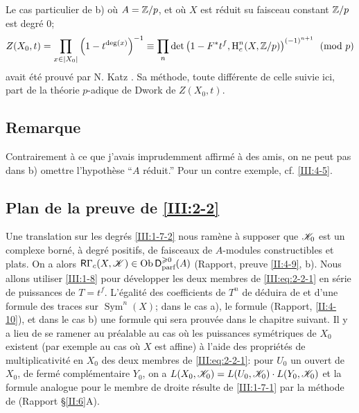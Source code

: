 Le cas particulier de b) où $A=\mathbb{Z}/p$, et où $X$ est réduit su faisceau 
constant $\mathbb{Z}/p$ est degré $0$;
\[
  Z(X_0,t) = \prod_{x\in |X_0|} \left(1-t^{\deg(x)}\right)^{-1}
      \equiv \prod_n \det\left(1-F^* t^f,\operatorname{H}_c^n(X,\mathbb{Z}/p)\right)^{(-1)^{n+1}} \pmod p
\]
avait été prouvé par N. Katz \cite[XXII 3.1]{sga7}. Sa méthode, toute 
différente de celle suivie ici, part de la théorie $p$-adique de Dwork de 
$Z(X_0,t)$. 





\subsection{Remarque}\label{III:2-7}


Contrairement à ce que j'avais imprudemment affirmé à des amis, on ne 
peut pas dans b) omettre l'hypothèse ``$A$ réduit.'' Pour un contre 
exemple, cf. \ref{III:4-5}. 





\subsection{Plan de la preuve de \ref{III:2-2}}\label{III:2-8}

Une translation sur les degrés \ref{III:1-7-2} nous ramène à supposer 
que $\mathscr{K}_0$ est un complexe borné, à degré positifs, de faisceaux de 
$A$-modules constructibles et plats. On a alors 
$\mathsf{R}\Gamma_c(X,\mathscr{K})\in \operatorname{Ob}\mathsf{D}_\text{parf}^{\geqslant 0}(A)$ (Rapport, 
preuve \ref{II:4-9}, b). Nous allons utiliser \ref{III:1-8} pour développer 
les deux membres de \eqref{III:eq:2-2-1} en série de puissances de $T=t^f$. 
L'égalité des coefficients de $T^n$ de déduira de 
\cite[XVII 5.5.21]{sga4} et d'une formule des traces sur 
$\operatorname{Sym}^n(X)$; dans le cas a), le formule (Rapport, 
\ref{II:4-10}), et dans le cas b) une formule qui sera prouvée dans le 
chapitre suivant. Il y a lieu de se ramener au préalable au cas où les 
puissances symétriques de $X_0$ existent (par exemple au cas où $X$ est 
affine) à l'aide des propriétés de multiplicativité en $X_0$ des deux 
membres de \eqref{III:eq:2-2-1}: pour $U_0$ un ouvert de $X_0$, de fermé 
complémentaire $Y_0$, on a $L(X_0,\mathscr{K}_0)=L(U_0,\mathscr{K}_0)\cdot L(Y_0,\mathscr{K}_0)$ et 
la formule analogue pour le membre de droite résulte de \ref{III:1-7-1} 
par la méthode de (Rapport \S\ref{II:6}A). 





